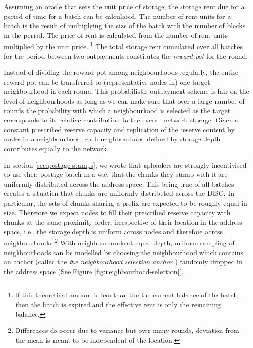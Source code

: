 Assuming an oracle that sets the unit price of storage, the storage rent due for a period of time for a batch can be calculated. The number of rent units for a batch is the result of multiplying the size of the batch with the number of blocks in the period. The price of rent is calculated from the number of rent units multiplied by the unit price.%
%
\footnote{If this theoretical amount is less than the the current balance of the batch, then the batch is expired and the effective rent is only the remaining balance.}
%
The total storage rent cumulated over all batches for the period between two outpayments constitutes the \emph{reward pot} for the round.

Instead of dividing the reward pot among neighbourhoods regularly, the entire reward pot can be transferred to (representative nodes in) one target neighbourhood in each round. This probabilistic outpayment scheme is fair on the level of neighbourhoods as long as we can make sure that over a large number of rounds the probability with which a  
neighbourhood is selected as the target corresponds to its relative contribution to the overall network storage. Given a constant prescribed reserve capacity and replication of the reserve content by nodes in a neighbourhood, each neighbourhood defined by storage depth contributes equally to the network. 

In section \ref{sec:postage-stamps}, we wrote that uploaders are strongly incentivised to use their postage batch in a way that the chunks they stamp with it are uniformly distributed across the address space. This being true of all batches creates a situation that chunks are uniformly distributed across the DISC. In particular, the sets of chunks sharing a prefix are expected to be roughly equal in size. Therefore we expect nodes to fill their prescribed reserve capacity with chunks at the same proximity order, irrespective of their location in the address space, i.e., the storage depth is uniform across  nodes and therefore across neighbourhoods.%
%
\footnote{Differences do occur due to variance but over many rounds, deviation from the mean is meant to be independent of the location.}
%
With neighbourhoods at equal depth, uniform sampling of neighbourhoods can be modelled by choosing the neighbourhood which contains an anchor (called the \emph{the neighbourhood selection anchor}%
%
%
) randomly dropped in the address space (See Figure \ref{fig:neighbourhood-selection}).


